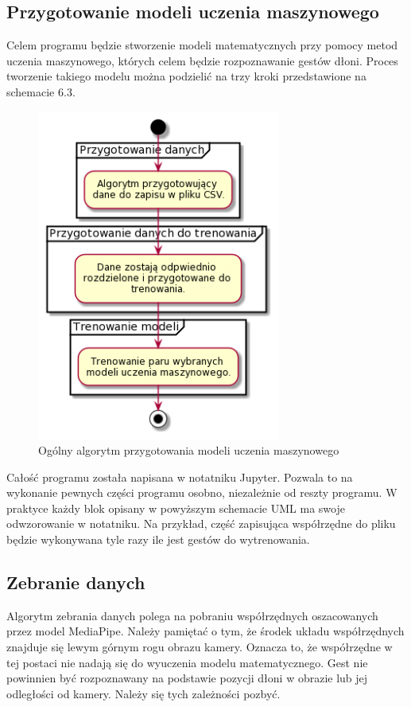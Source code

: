     \subsection{Przygotowanie modeli uczenia maszynowego}
    \quad Celem programu będzie stworzenie modeli matematycznych przy pomocy metod uczenia maszynowego, których celem będzie rozpoznawanie gestów dłoni. Proces tworzenie takiego modelu można podzielić na trzy kroki przedstawione na schemacie 6.3. 

    \begin{figure}[H]
        \begin{center}
            \includegraphics[width=8cm]{../images/full_algorithm.png}
            \caption{Ogólny algorytm przygotowania modeli uczenia maszynowego}
        \end{center}
    \end{figure}

    \quad Całość programu została napisana w notatniku Jupyter. Pozwala to na wykonanie pewnych części programu osobno, niezależnie od reszty programu. W praktyce każdy blok opisany w powyższym schemacie UML ma swoje odwzorowanie w notatniku. Na przykład, część zapisująca współrzędne do pliku będzie wykonywana tyle razy ile jest gestów do wytrenowania. 

    \subsection{Zebranie danych}
    \quad Algorytm zebrania danych polega na pobraniu współrzędnych oszacowanych przez model MediaPipe. Należy pamiętać o tym, że środek układu współrzędnych znajduje się lewym górnym rogu obrazu kamery. Oznacza to, że współrzędne w tej postaci nie nadają się do wyuczenia modelu matematycznego. Gest nie powinnien być rozpoznawany na podstawie pozycji dłoni w obrazie lub jej odległości od kamery. Należy się tych zależności pozbyć. 
    
